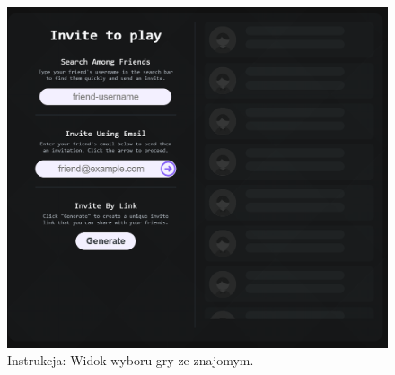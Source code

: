 \documentclass[12pt,a4paper]{article}
\begin{document}
\vspace{0.5cm}
\begin{figure}[h!]
    \centering
    \includegraphics[width=1\textwidth]{images/ins_min_pvf.png}
    \caption{Instrukcja: Widok wyboru gry ze znajomym.}
\end{figure}

\newpage
\end{document}
